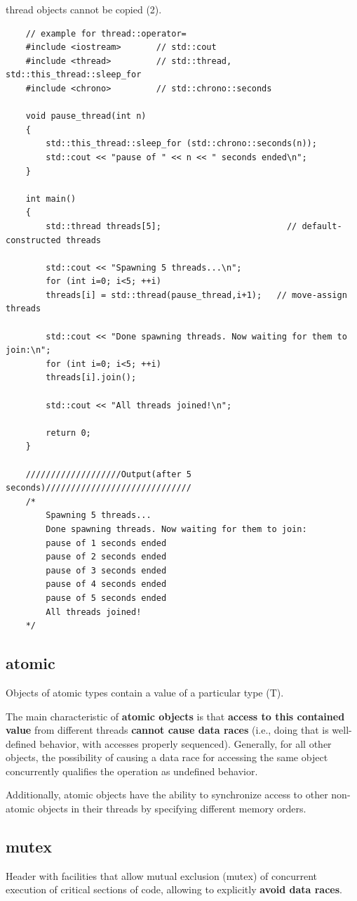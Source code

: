 \documentclass[UTF8,a4paper,12pt]{ctexbook}
\begin{document}
		thread objects cannot be copied (2).
\begin{lstlisting}
	// example for thread::operator=
	#include <iostream>       // std::cout
	#include <thread>         // std::thread, std::this_thread::sleep_for
	#include <chrono>         // std::chrono::seconds
	
	void pause_thread(int n) 
	{
		std::this_thread::sleep_for (std::chrono::seconds(n));
		std::cout << "pause of " << n << " seconds ended\n";
	}
	
	int main() 
	{
		std::thread threads[5];                         // default-constructed threads
		
		std::cout << "Spawning 5 threads...\n";
		for (int i=0; i<5; ++i)
		threads[i] = std::thread(pause_thread,i+1);   // move-assign threads
		
		std::cout << "Done spawning threads. Now waiting for them to join:\n";
		for (int i=0; i<5; ++i)
		threads[i].join();
		
		std::cout << "All threads joined!\n";
		
		return 0;
	}
	
	///////////////////Output(after 5 seconds)/////////////////////////////
	/*
		Spawning 5 threads...
		Done spawning threads. Now waiting for them to join:
		pause of 1 seconds ended
		pause of 2 seconds ended
		pause of 3 seconds ended
		pause of 4 seconds ended
		pause of 5 seconds ended
		All threads joined!
	*/
\end{lstlisting}		
	\subsection{atomic}
		Objects of atomic types contain a value of a particular type (T).
		
		The main characteristic of \textbf{atomic objects} is that \textbf{access to this contained value} from different threads \textbf{cannot cause data races} (i.e., doing that is well-defined behavior, with accesses properly sequenced). Generally, for all other objects, the possibility of causing a data race for accessing the same object concurrently qualifies the operation as undefined behavior.
		
		Additionally, atomic objects have the ability to synchronize access to other non-atomic objects in their threads by specifying different memory orders.
	\subsection{mutex}
		Header with facilities that allow mutual exclusion (mutex) of concurrent execution of critical sections of code, allowing to explicitly \textbf{avoid data races}.
	
\end{document}
